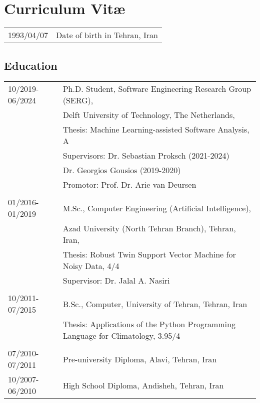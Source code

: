 \chapter*{Curriculum Vit\ae}

\makeatletter
\authors{\@firstname\ {\titleshape\@lastname}}
\makeatother

\noindent
\begin{longtable}{p{} p{}}
    1993/04/07 & Date of birth in Tehran, Iran
\end{longtable}

\section*{Education}
\begin{longtable}{p{} p{}}
    10/2019-06/2024 & Ph.D. Student, Software Engineering Research Group (SERG), \\
     & Delft University of Technology, The Netherlands, \\
     & Thesis: Machine Learning-assisted Software Analysis, A \\
     & Supervisors: Dr. Sebastian Proksch (2021-2024) \\
     &  \hspace*{5.1em} Dr. Georgios Gousios (2019-2020) \\
     & Promotor: Prof. Dr. Arie van Deursen \\
     & \\

     01/2016-01/2019 & M.Sc., Computer Engineering (Artificial Intelligence), \\
     & Azad University (North Tehran Branch), Tehran, Iran, \\
     & Thesis: Robust Twin Support Vector Machine for Noisy Data, 4/4 \\
     & Supervisor: Dr. Jalal A. Nasiri \\
     & \\

     10/2011-07/2015 & B.Sc., Computer, University of Tehran, Tehran, Iran \\
     & Thesis: Applications of the Python Programming Language for Climatology, 3.95/4\\
     & \\
     07/2010-07/2011 & Pre-university Diploma, Alavi, Tehran, Iran \\
     10/2007-06/2010 & High School Diploma, Andisheh, Tehran, Iran \\    
\end{longtable}

